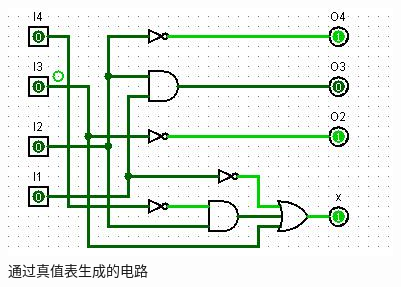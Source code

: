 \documentclass[UTF8]{article}
\begin{document}
	\begin{figure}[H]
		\centering
		\includegraphics[scale=0.7]{CurcuitGenerateByBoolTable.jpg}
		\caption{通过真值表生成的电路}
		\label{CurcuitGenerateByBoolTable}
	\end{figure}\par
	
\end{document}

